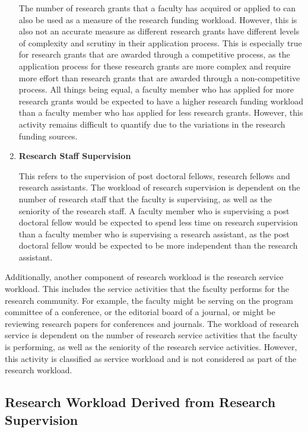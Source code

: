 \begin{enumerate}
        The number of research grants that a faculty has acquired or applied to can also be used as a measure of the research funding workload. However, this is also not an accurate measure as different research grants have different levels of complexity and scrutiny in their application process. This is especially true for research grants that are awarded through a competitive process, as the application process for these research grants are more complex and require more effort than research grants that are awarded through a non-competitive process. All things being equal, a faculty member who has applied for more research grants would be expected to have a higher research funding workload than a faculty member who has applied for less research grants. However, this activity remains difficult to quantify due to the variations in the research funding sources.

  \item \textbf{Research Staff Supervision}

        This refers to the supervision of post doctoral fellows, research fellows and research assistants. The workload of research supervision is dependent on the number of research staff that the faculty is supervising, as well as the seniority of the research staff. A faculty member who is supervising a post doctoral fellow would be expected to spend less time on research supervision than a faculty member who is supervising a research assistant, as the post doctoral fellow would be expected to be more independent than the research assistant.


\end{enumerate}

Additionally, another component of research workload is the research service workload. This includes the service activities that the faculty performs for the research community. For example, the faculty might be serving on the program committee of a conference, or the editorial board of a journal, or might be reviewing research papers for conferences and journals. The workload of research service is dependent on the number of research service activities that the faculty is performing, as well as the seniority of the research service activities. However, this activity is classified as service workload and is not considered as part of the research workload.

\subsection{Research Workload Derived from Research Supervision}
\label{sec:research_workload_derived_from_research_supervision}


